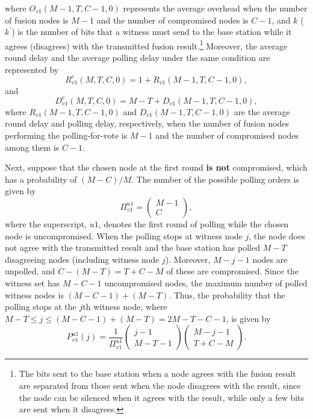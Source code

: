 \documentclass[12pt, onecolumn, draftcls]{IEEEtran}
\begin{document}
where $O_{v1}(M-1,T,C-1,0)$ represents the average overhead when the
number of fusion nodes is $M-1$ and the number of compromised nodes
is $C-1$, and $k$ ($k^{\prime}$) is the number of bits that a
witness must send to the base station while it agrees (disagrees)
with the transmitted fusion result.\footnote{The bits sent to the
base station when a node agrees with the fusion result are separated
from those sent when the node disagrees with the result, since the
node can be silenced when it agrees with the result, while only a
few bits are sent when it disagrees.} Moreover, the average round
delay and the average polling delay under the same condition are
represented by
\begin{equation}
R_{v1}^c(M,T,C,0) = 1 + R_{v1}(M-1,T,C-1,0),
\label{eqn:polling_invalid_compromised_round_delay0}
\end{equation}
and
\begin{equation}
D_{v1}^c(M,T,C,0) = M-T + D_{v1}(M-1,T,C-1,0),
\label{eqn:polling_invalid_compromised_polling_delay0}
\end{equation}
where $R_{v1}(M-1,T,C-1,0)$ and $D_{v1}(M-1,T,C-1,0)$ are the
average round delay and polling delay, respectively, when the number
of fusion nodes performing the polling-for-vote is $M-1$ and the
number of compromised nodes among them is $C-1$.

Next, suppose that the chosen node at the first round {\bf is  not}
compromised, which has a probability of $(M-C)/M$. The number of the
possible polling orders is given by
\[
\Pi_{v1}^{u1} = \left(\begin{array}{c} M-1 \\ C \end{array}\right),
\]
where the superscript, $u1$, denotes the first round of polling
while the chosen node is uncompromised. When the polling stops at
witness node $j$, the node does not agree with the transmitted
result and the base station has polled $M-T$ disagreeing nodes
(including witness node $j$). Moreover, $M-j-1$ nodes are unpolled,
and $C-(M-T)=T+C-M$ of these are compromised. Since the witness set
has $M-C-1$ uncompromised nodes, the maximum number of polled
witness nodes is $(M-C-1)+(M-T)$. Thus, the probability that the
polling stops at the $j$th witness node, where $M-T \le j \le
(M-C-1)+(M-T)=2M-T-C-1$, is given by
\begin{equation*}
P_{v1}^{u1}(j)=\frac{1}{\Pi_{v1}^{u1}}\left(\begin{array}{c} j-1 \\
M-T-1
\end{array}\right) \left(\begin{array}{c} M-j-1 \\ T+C-M
\end{array}\right).
\end{equation*}
\end{document}
